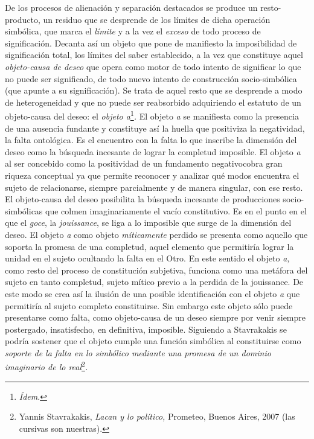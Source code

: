 \documentclass{book}
\begin{document}
De los procesos de alienación y separación destacados se produce un
resto-producto, un residuo que se desprende de los límites de dicha
operación simbólica, que marca el \emph{límite} y a la vez el
\emph{exceso} de todo proceso de significación. Decanta así un objeto
que pone de manifiesto la imposibilidad de significación total, los
límites del saber establecido, a la vez que constituye aquel
\emph{objeto-causa de deseo} que opera como motor de todo intento de
significar lo que no puede ser significado, de todo nuevo intento de
construcción socio-simbólica (que apunte a su significación). Se trata
de aquel resto que se desprende a modo de heterogeneidad y que no puede
ser reabsorbido adquiriendo el estatuto de un objeto-causa del deseo: el
\emph{objeto a}\footnote{\emph{Ídem}.}\emph{.} El objeto \emph{a} se
manifiesta como la presencia de una ausencia fundante y constituye así
la huella que positiviza la negatividad, la falta ontológica. Es el
encuentro con la falta lo que inscribe la dimensión del deseo como la
búsqueda incesante de lograr la completud imposible. El objeto \emph{a}
al ser concebido como la positividad de un fundamento negativocobra gran
riqueza conceptual ya que permite reconocer y analizar qué modos
encuentra el sujeto de relacionarse, siempre parcialmente y de manera
singular, con ese resto. El objeto-causa del deseo posibilita la
búsqueda incesante de producciones socio-simbólicas que colmen
imaginariamente el vacío constitutivo. Es en el punto en el que el
\emph{goce}, la \emph{jouissance}, se liga a lo imposible que surge de
la dimensión del deseo. El objeto \emph{a} como objeto
\emph{míticamente} perdido se presenta como aquello que soporta la
promesa de una completud, aquel elemento que permitiría lograr la unidad
en el sujeto ocultando la falta en el Otro. En este sentido el objeto
\emph{a,} como resto del proceso de constitución subjetiva, funciona
como una metáfora del sujeto en tanto completud, sujeto mítico previo a
la perdida de la jouissance. De este modo se crea así la ilusión de una
posible identificación con el objeto \emph{a} que permitiría al sujeto
completo constituirse. Sin embargo este objeto sólo puede presentarse
como falta, como objeto-causa de un deseo siempre por venir siempre
postergado, insatisfecho, en definitiva, imposible. Siguiendo a
Stavrakakis se podría sostener que el objeto cumple una función
simbólica al constituirse como \emph{soporte de la falta en lo simbólico
mediante una promesa de un dominio imaginario de lo
real}\footnote{Yannis Stavrakakis, \emph{Lacan y lo político,} Prometeo,
  Buenos Aires, 2007 (las cursivas son nuestras).}\emph{.}
\end{document}
